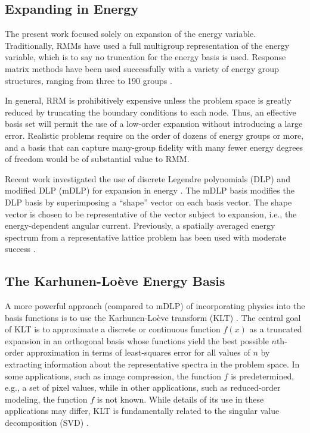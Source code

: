 \documentclass{anstrans}
\begin{document}
\subsection{Expanding in Energy}

The present work focused solely on expansion of the energy variable.
Traditionally, RMMs have used a full multigroup
representation of the energy variable, which is to say no truncation for
the energy basis is used.  Response matrix methods have been used
successfully with a variety of energy group structures, ranging from three to
190 groups \cite{ishii2009tdd, forget2006tdh, forget2004hcm}.

In general, RRM is prohibitively expensive unless the problem space is
greatly reduced by truncating the boundary conditions to each node.  Thus, an
effective basis set will permit the use of a low-order expansion without
introducing a large error.  Realistic problems require on the order of dozens
of energy groups
or more, and a basis that can capture many-group fidelity with
many fewer energy degrees of freedom would be of substantial
value to RMM.

Recent work investigated the use of discrete Legendre polynomials (DLP) and
modified DLP (mDLP) for expansion in energy \cite{Roberts2014}.  The mDLP basis
modifies the DLP basis by superimposing a ``shape'' vector on each basis vector.
 The shape vector is chosen to be representative of the vector subject to
expansion, i.e., the energy-dependent angular current.  Previously, a spatially
averaged energy spectrum from a representative lattice problem has been used
with moderate success \cite{Roberts2014}.

\subsection{The  Karhunen-Lo\`{e}ve Energy Basis}

A more powerful approach (compared to mDLP) of incorporating physics into the
basis functions is to use the Karhunen-Lo\`{e}ve transform (KLT)
\cite{Dony2001}.  The central goal of KLT is to approximate a discrete or
continuous function $f(x)$ as a truncated expansion in an orthogonal basis whose
functions yield the best possible $n$th-order approximation in terms of
least-squares error for all values of $n$ by extracting information about the
representative spectra in the problem space.  In some applications, such as
image compression, the function $f$ is predetermined, e.g., a set of pixel
values, while in other applications, such as reduced-order modeling, the
function $f$ is not known.  While details of its use in these applications may
differ, KLT is fundamentally related to the singular value decomposition (SVD)
\cite{reedThesis}.
\end{document}
